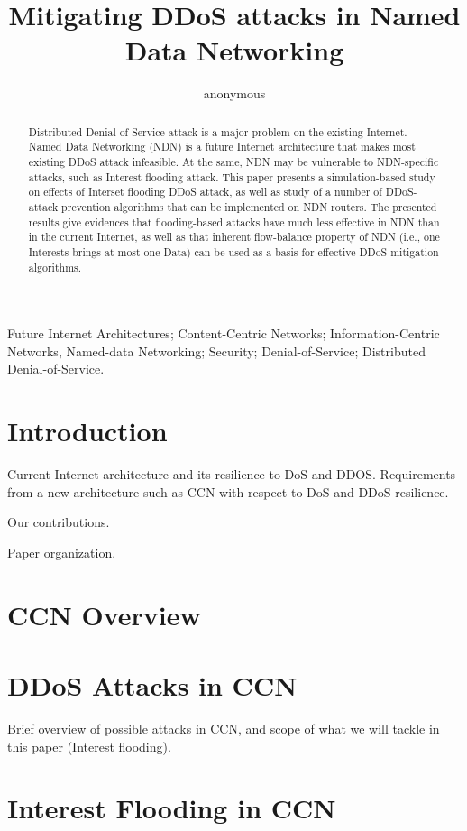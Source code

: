 \documentclass[conference]{IEEEtran}
\title{Mitigating DDoS attacks in Named Data Networking}%
\author{anonymous}
\begin{document}
\maketitle

\begin{abstract}
%
Distributed Denial of Service attack is a major problem on the existing Internet.
Named Data Networking (NDN) is a future Internet architecture that makes most existing DDoS attack infeasible.
At the same, NDN may be vulnerable to NDN-specific attacks, such as Interest flooding attack. 
This paper presents a simulation-based study on effects of Interset flooding DDoS attack, as well as study of a number of DDoS-attack prevention algorithms that can be implemented on NDN routers.
The presented results give evidences that flooding-based attacks have much less effective in NDN than in the current Internet, as well as that inherent flow-balance property of NDN (i.e., one Interests brings at most one Data) can be used as a basis for effective DDoS mitigation algorithms. 
%
\end{abstract}

 Future Internet Architectures;
Content-Centric Networks; Information-Centric Networks, Named-data
Networking; Security; Denial-of-Service; Distributed
Denial-of-Service.

\section{Introduction \label{intro}}
Current Internet architecture and its resilience to DoS and DDOS. Requirements from a new architecture such as CCN with respect to DoS and DDoS resilience.

Our contributions.

Paper organization.

\section{ CCN Overview\label{ccn-intro}}

\section { DDoS Attacks in CCN \label{ccn-ddos}}
Brief overview of possible attacks in CCN, and scope of what we will tackle in this paper (Interest flooding).

\section { Interest Flooding in CCN }
\end{document}
